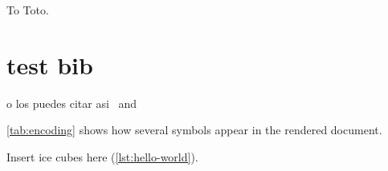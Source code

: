 \documentclass[letterpaper,12pt]{article}
\begin{document}

\begin{dedication}
To Toto.
\end{dedication}
\newpage


\bodymatter

\chapter{test bib}

\cite{ref:A,ref:B,ref:C} o los puedes citar asi~\cite{ref:A} and 




\backmatter





\label{app:encoding}
\ref{tab:encoding} shows how several symbols appear in the rendered document.



Insert ice cubes here (\ref{lst:hello-world}).


\end{document}
